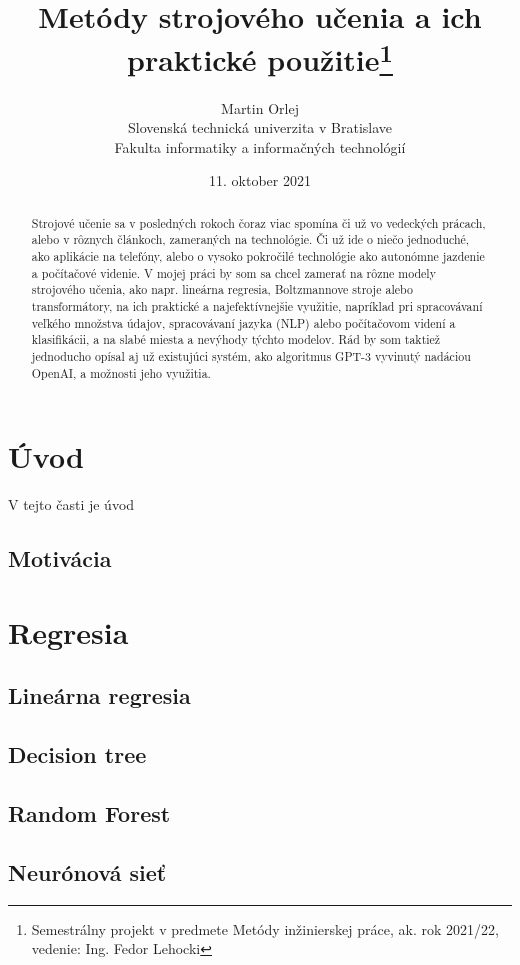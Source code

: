 \documentclass[8pt,twoside,slovak,a4paper]{article}
\title{Metódy strojového učenia a ich praktické použitie\thanks{Semestrálny projekt v predmete Metódy inžinierskej práce, ak. rok 2021/22, vedenie: Ing. Fedor Lehocki}}
\author{Martin Orlej\\[2pt]
	{\small Slovenská technická univerzita v Bratislave}\\
	{\small Fakulta informatiky a informačných technológií}\\
	}
\date{\small 11. oktober 2021}
\begin{document}
\maketitle

\begin{abstract}
Strojové učenie sa v posledných rokoch čoraz viac spomína či už vo vedeckých prácach, alebo v rôznych článkoch, zameraných na technológie. Či už ide o niečo jednoduché, ako aplikácie na telefóny, alebo o vysoko pokročilé technológie ako autonómne jazdenie a počítačové videnie. V mojej práci by som sa chcel zamerať na rôzne modely strojového učenia, ako napr. lineárna regresia, Boltzmannove stroje alebo transformátory, na ich praktické a najefektívnejšie využitie, napríklad pri spracovávaní veľkého množstva údajov, spracovávaní jazyka (NLP) alebo počítačovom videní a klasifikácii, a na slabé miesta a nevýhody týchto modelov. Rád by som taktiež jednoducho opísal aj už existujúci systém, ako algoritmus GPT-3 vyvinutý nadáciou OpenAI, a možnosti jeho využitia.
\end{abstract}






\section{Úvod} \label {uvod}
V tejto časti je úvod

\subsection{Motivácia} \label{motivacia}

\section{Regresia} \label{regresia}
\subsection{Lineárna regresia} \label{linearnareg}
\subsection{Decision tree}
\subsection{Random Forest}
\subsection{Neurónová sieť}
\end{document}
